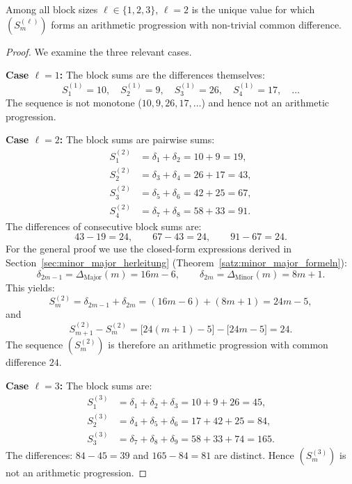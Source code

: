 \begin{satz}\label{satz:eindeutigkeit}
Among all block sizes $\ell \in \{1, 2, 3\}$, $\ell = 2$ is the unique value
for which $(S_m^{(\ell)})$ forms an arithmetic progression with non-trivial
common difference.
\end{satz}

\begin{proof}
We examine the three relevant cases.

\textbf{Case $\ell = 1$:} The block sums are the differences themselves:
\[
  S_1^{(1)} = 10,\quad S_2^{(1)} = 9,\quad S_3^{(1)} = 26,\quad
  S_4^{(1)} = 17,\quad \ldots
\]
The sequence is not monotone ($10, 9, 26, 17, \ldots$) and hence not
an arithmetic progression.

\textbf{Case $\ell = 2$:} The block sums are pairwise sums:
\begin{align*}
S_1^{(2)} &= \delta_1 + \delta_2 = 10 + 9 = 19,\\
S_2^{(2)} &= \delta_3 + \delta_4 = 26 + 17 = 43,\\
S_3^{(2)} &= \delta_5 + \delta_6 = 42 + 25 = 67,\\
S_4^{(2)} &= \delta_7 + \delta_8 = 58 + 33 = 91.
\end{align*}
The differences of consecutive block sums are:
\[
  43 - 19 = 24,\qquad 67 - 43 = 24,\qquad 91 - 67 = 24.
\]
For the general proof we use the closed-form expressions derived in
Section~\ref{sec:minor_major_herleitung}
(Theorem~\ref{satz:minor_major_formeln}):
\[
  \delta_{2m-1} = \Delta_{\mathrm{Major}}(m) = 16m - 6,\qquad
  \delta_{2m} = \Delta_{\mathrm{Minor}}(m) = 8m + 1.
\]
This yields:
\[
  S_m^{(2)} = \delta_{2m-1} + \delta_{2m}
            = (16m-6) + (8m+1)
            = 24m - 5,
\]
and
\[
  S_{m+1}^{(2)} - S_m^{(2)}
  = \bigl[24(m+1)-5\bigr] - \bigl[24m-5\bigr]
  = 24.
\]
The sequence $(S_m^{(2)})$ is therefore an arithmetic progression with common
difference $24$.

\textbf{Case $\ell = 3$:} The block sums are:
\begin{align*}
S_1^{(3)} &= \delta_1 + \delta_2 + \delta_3 = 10 + 9 + 26 = 45,\\
S_2^{(3)} &= \delta_4 + \delta_5 + \delta_6 = 17 + 42 + 25 = 84,\\
S_3^{(3)} &= \delta_7 + \delta_8 + \delta_9 = 58 + 33 + 74 = 165.
\end{align*}
The differences: $84 - 45 = 39$ and $165 - 84 = 81$ are distinct.
Hence $(S_m^{(3)})$ is not an arithmetic progression.
\end{proof}

